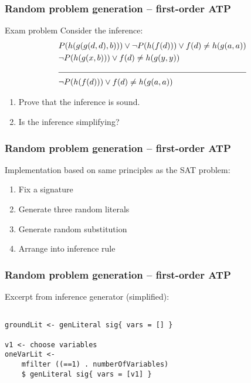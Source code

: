 \documentclass[xcolor={table}]{beamer}
\begin{document}


\begin{frame}
    \frametitle{Random problem generation -- first-order ATP}

    \begin{block}{Exam problem}
        Consider the inference:
        \begin{align*}
            & P(h(g(g(d,d),b))) \lor \lnot P(h(f(d))) \lor f(d) \neq h(g(a,a)) \\
            & \lnot P(h(g(x,b))) \lor f(d) \neq h(g(y,y)) \\
            \cline{1-2}
            & \lnot P(h(f(d))) \lor f(d) \neq h(g(a,a))
        \end{align*}
        \vspace*{-1.5em}
        \begin{enumerate}
            \item Prove that the inference is sound.
            \item Is the inference simplifying?
        \end{enumerate}
    \end{block}
\end{frame}

\begin{frame}
    \frametitle{Random problem generation -- first-order ATP}

    Implementation based on same principles as the SAT problem:
    \begin{enumerate}
        \item Fix a signature
        \item Generate three random literals
        \item Generate random substitution
        \item Arrange into inference rule
    \end{enumerate}
\end{frame}

\begin{frame}[fragile]
    \frametitle{Random problem generation -- first-order ATP}

    Excerpt from inference generator (simplified):

\begin{lstlisting}

groundLit <- genLiteral sig{ vars = [] }

v1 <- choose variables
oneVarLit <-
    mfilter ((==1) . numberOfVariables)
    $ genLiteral sig{ vars = [v1] }
\end{lstlisting}
\end{frame}
\end{document}
